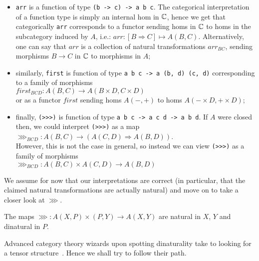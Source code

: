 \begin{itemize}
    \item \verb|arr| is a function of type \verb|(b -> c) -> a b c|.
        The categorical interpretation of a function type is simply an internal
        hom in $\mathbb{C}$, hence we get that categorically \verb|arr| corresponds
        to a functor sending homs in $\mathbb{C}$ to homs in the subcategory induced
        by $A$, i.e.: $arr: [B \Rightarrow C] \mapsto A(B, C)$. Alternatively, one
        can say that $arr$ is a collection of natural transformations
        $arr_{BC}$, sending morphisms $B \to C$ in $\mathbb{C}$ to morphisms in $A$;
    \item similarly, \verb|first| is function of type
        \verb|a b c -> a (b, d) (c, d)|
        corresponding to a family of morphisms\\
        $first_{BCD}: A(B, C) \to A(B \times D,C \times D)$\\
        or as a functor $first$ sending homs $A(-, +)$ to homs $A(- \times D, +
        \times D)$;
    \item finally, \verb|(>>>)| is function of type \verb|a b c -> a c d -> a b d|.
        If $A$ were closed then, we could interpret \verb|(>>>)| as a
        map\\
        $\ggg_{BCD}: A(B, C) \to (A(C, D) \Rightarrow A(B, D))$.\\
        However, this is not the case in general, so instead we can view
        \verb|(>>>)| as a family of morphisms\\
        $\ggg_{BCD}: A(B, C) \times A(C, D) \to A(B, D)$\\
\end{itemize}

We assume for now that our interpretations are correct (in particular, that the
claimed natural transformations are actually natural) and move on to take a
closer look at $\ggg$.

\begin{lemma}
    The maps $\ggg: A(X, P) \times (P, Y) \to A(X, Y)$ are natural in $X$,
    $Y$ and dinatural in $P$.
\end{lemma}

Advanced category theory wizards upon spotting dinaturality take to looking
for a tensor structure~\cite[p.~8]{arr-like-mon}. Hence we shall try to follow
their path.
